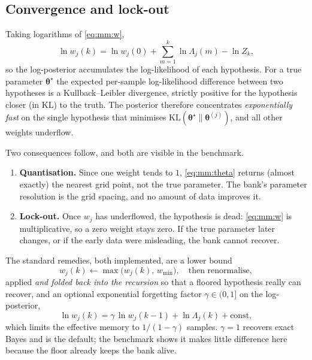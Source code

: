 \subsection{Convergence and lock-out}
Taking logarithms of \eqref{eq:mm:w},
\begin{equation}
\ln w_j(k) = \ln w_j(0) + \sum_{m=1}^{k}\ln\Lambda_j(m) - \ln Z_k ,
\label{eq:mm:logw}
\end{equation}
so the log-posterior accumulates the log-likelihood of each hypothesis.  For a true parameter
$\bm\theta^\star$ the expected per-sample log-likelihood difference between two hypotheses is a
Kullback--Leibler divergence, strictly positive for the hypothesis closer (in KL) to the truth.  The
posterior therefore concentrates \emph{exponentially fast} on the single hypothesis that minimises
$\mathrm{KL}(\bm\theta^\star\|\bm\theta^{(j)})$, and all other weights underflow.

Two consequences follow, and both are visible in the benchmark.
\begin{enumerate}[leftmargin=1.6em]
\item \textbf{Quantisation.}  Since one weight tends to $1$, \eqref{eq:mm:theta} returns (almost
exactly) the nearest grid point, not the true parameter.  The bank's parameter resolution is the
grid spacing, and no amount of data improves it.
\item \textbf{Lock-out.}  Once $w_j$ has underflowed, the hypothesis is dead: \eqref{eq:mm:w} is
multiplicative, so a zero weight stays zero.  If the true parameter later changes, or if the early
data were misleading, the bank cannot recover.
\end{enumerate}
The standard remedies, both implemented, are a lower bound
\begin{equation}
w_j(k)\gets\max\big(w_j(k),\,w_{\min}\big),\quad\text{then renormalise},
\label{eq:mm:floor}
\end{equation}
applied \emph{and folded back into the recursion} so that a floored hypothesis really can recover,
and an optional exponential forgetting factor $\gamma\in(0,1]$ on the log-posterior,
\begin{equation}
\ln w_j(k) = \gamma\,\ln w_j(k-1) + \ln\Lambda_j(k) + \text{const},
\label{eq:mm:gamma}
\end{equation}
which limits the effective memory to $1/(1-\gamma)$ samples.  $\gamma=1$ recovers exact Bayes and is
the default; the benchmark shows it makes little difference here because the floor already keeps the
bank alive.

